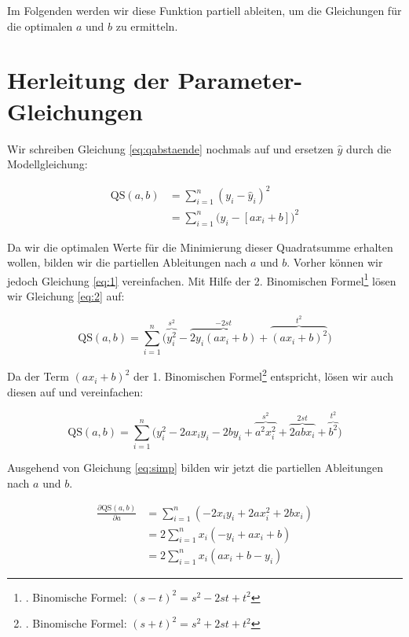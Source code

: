\documentclass[ngerman, 12pt]{scrartcl}
\def\qs{\text{QS}(a,b)}
\def\sm{\sum\limits_{i=1}^{n}}
\begin{document}

Im Folgenden werden wir diese Funktion partiell ableiten, um die Gleichungen für die optimalen \(a\) und \(b\) zu ermitteln. 

\section{Herleitung der Parameter-Gleichungen}

Wir schreiben Gleichung \ref{eq:qabstaende} nochmals auf und ersetzen \(\hat y\) durch die Modellgleichung:

\begin{align}\label{eq:1}
\qs	&  = \sm \left(y_i - \hat{y}_i\right)^2\\
								&= \sm \Big(y_i - [ax_i+b]\Big)^2 \label{eq:2}
\end{align}

Da wir die optimalen Werte für die Minimierung dieser Quadratsumme erhalten wollen, bilden wir die partiellen Ableitungen nach $a$ und $b$. Vorher können wir jedoch Gleichung \ref{eq:1} vereinfachen. Mit Hilfe der 2. Binomischen Formel\footnote{. Binomische Formel: \((s-t)^2 = s^2 -2st + t^2\)} lösen wir Gleichung \ref{eq:2} auf:

\begin{equation}
	\qs = \sm \Big( \overbrace{y_i^2}^{s^2} - \overbrace{2y_i (ax_i+b)}^{-2st} + \overbrace{(ax_i +b)^2}^{t^2}\Big)
\end{equation}

Da der Term \((ax_i +b)^2\) der 1. Binomischen Formel\footnote{. Binomische Formel: \((s+t)^2 = s^2 +2st + t^2\)} entspricht, lösen wir auch diesen auf und vereinfachen:

\begin{equation}
	\qs = \sm \Big(y_i^2 - 2ax_iy_i - 2by_i + \overbrace{a^2x_i^2}^{s^2} + \overbrace{2abx_i}^{2st} + \overbrace{b^2}^{t^2}\Big)\label{eq:simp}
\end{equation}

Ausgehend von Gleichung \ref{eq:simp} bilden wir jetzt die partiellen Ableitungen nach \(a\) und \(b\). 

\begin{align}
\frac{\partial \qs}{\partial a}	&= \sm (-2x_iy_i + 2ax_i^2 + 2bx_i) \label{eq:parta1}\\
								&= 2 \sm x_i(-y_i + ax_i + b) \label{eq:parta2a} \\
								&= 2 \sm x_i(ax_i + b -y_i ) \label{eq:parta2} 
\end{align}
\end{document}
